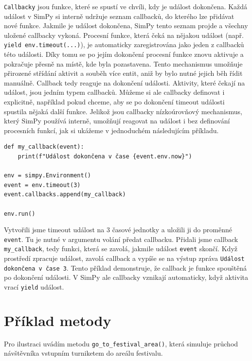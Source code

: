 \documentclass[12pt,a4paper]{article}
\begin{document}
\texttt{Callbacky} jsou funkce, které se spustí ve chvíli, kdy je událost dokončena. Každá událost v SimPy si interně udržuje seznam callbacků, do kterého lze přidávat nové funkce. Jakmile je událost dokončena, SimPy tento seznam projde a všechny uložené callbacky vykoná. Procesní funkce, která čeká na nějakou událost (např. \texttt{yield env.timeout(...)}), je automaticky zaregistrována jako jeden z callbacků této události. Díky tomu se po jejím dokončení procesní funkce znovu aktivuje a pokračuje přesně na místě, kde byla pozastavena. Tento mechanismus umožňuje přirozené střídání aktivit a souběh více entit, aniž by bylo nutné jejich běh řídit manuálně. Callback tedy reaguje na dokončení události. Aktivity, které čekají na událost, jsou jedním typem callbacků. Můžeme si ale callbacky definovat i explicitně, například pokud chceme, aby se po dokončení timeout události spustila nějaká další funkce. Jelikož jsou callbacky nízkoúrovňový mechanismus, který SimPy používá interně, umožňují reagovat na událost i bez definování procesních funkcí, jak si ukážeme v jednoduchém následujícím příkladu.

 \begin{verbatim} 
def my_callback(event):
    print(f"Událost dokončena v čase {event.env.now}")

env = simpy.Environment()
event = env.timeout(3)
event.callbacks.append(my_callback)

env.run()
\end{verbatim}

Vytvořili jsme timeout událost na 3 časové jednotky a uložili ji do proměnné \texttt{event}. Tu je nutné v argumentu volání předat callbacku.  Přidali jsme callback \texttt{my\_callback}, tedy funkci, která se zavolá, jakmile událost \texttt{event} skončí. Když prostředí zpracuje událost, zavolá callback a vypíše se na výstup zpráva \texttt{Událost dokončena v čase 3}. Tento příklad demonstruje, že callback je funkce spouštěná po dokončení události. V SimPy ale callbacky vznikají automaticky, když aktivita vrací \texttt{yield} událost.


\newpage

\section{Příklad metody}
Pro ilustraci uvádím metodu \texttt{go\_to\_festival\_area()}, která simuluje průchod návštěvníka vstupním turniketem do areálu festivalu.
\end{document}

